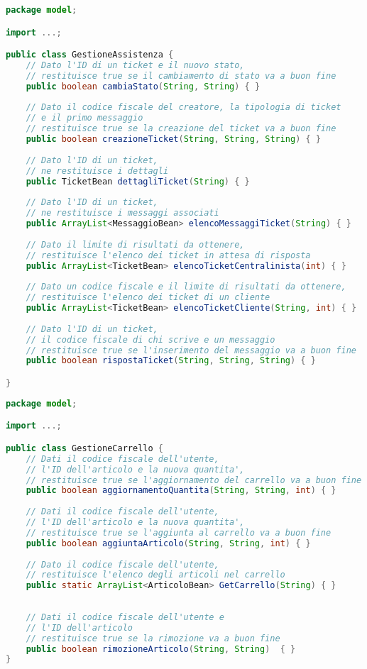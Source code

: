 \documentclass[12pt,a4paper]{article}
\begin{document}
\begin{lstlisting}[language=Java]
package model;

import ...;

public class GestioneAssistenza {
	// Dato l'ID di un ticket e il nuovo stato, 
	// restituisce true se il cambiamento di stato va a buon fine
	public boolean cambiaStato(String, String) { }
	
	// Dato il codice fiscale del creatore, la tipologia di ticket
	// e il primo messaggio
	// restituisce true se la creazione del ticket va a buon fine
	public boolean creazioneTicket(String, String, String) { }
	
	// Dato l'ID di un ticket, 
	// ne restituisce i dettagli
	public TicketBean dettagliTicket(String) { }
	
	// Dato l'ID di un ticket, 
	// ne restituisce i messaggi associati
	public ArrayList<MessaggioBean> elencoMessaggiTicket(String) { }
	
	// Dato il limite di risultati da ottenere,
	// restituisce l'elenco dei ticket in attesa di risposta
	public ArrayList<TicketBean> elencoTicketCentralinista(int) { }
	
	// Dato un codice fiscale e il limite di risultati da ottenere,
	// restituisce l'elenco dei ticket di un cliente
	public ArrayList<TicketBean> elencoTicketCliente(String, int) { }
	
	// Dato l'ID di un ticket,
	// il codice fiscale di chi scrive e un messaggio
	// restituisce true se l'inserimento del messaggio va a buon fine
	public boolean rispostaTicket(String, String, String) { }

}
\end{lstlisting}

\newpage

\begin{lstlisting}[language=Java]
package model;

import ...;

public class GestioneCarrello {
	// Dati il codice fiscale dell'utente,
	// l'ID dell'articolo e la nuova quantita',
	// restituisce true se l'aggiornamento del carrello va a buon fine
	public boolean aggiornamentoQuantita(String, String, int) { }
	
	// Dati il codice fiscale dell'utente,
	// l'ID dell'articolo e la nuova quantita',
	// restituisce true se l'aggiunta al carrello va a buon fine
	public boolean aggiuntaArticolo(String, String, int) { }
	
	// Dato il codice fiscale dell'utente,
	// restituisce l'elenco degli articoli nel carrello
	public static ArrayList<ArticoloBean> GetCarrello(String) { }
	
	
	// Dati il codice fiscale dell'utente e
	// l'ID dell'articolo 
	// restituisce true se la rimozione va a buon fine
	public boolean rimozioneArticolo(String, String)  { }
}
\end{lstlisting}
\end{document}
